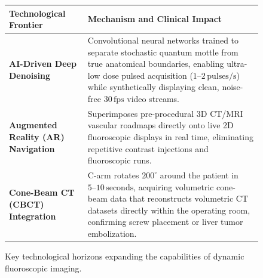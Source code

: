 \documentclass[11pt,a4paper]{article}
\begin{document}
\begin{figure}[htbp]
\centering
\setlength{\tabcolsep}{4pt}
\begin{tabular}{p{4.2cm}p{10.5cm}}
\toprule
\textbf{Technological Frontier} & \textbf{Mechanism and Clinical Impact} \\
\midrule
\textbf{AI-Driven Deep Denoising} & Convolutional neural networks trained to separate stochastic quantum mottle from true anatomical boundaries, enabling ultra-low dose pulsed acquisition ($1\text{--}2\,\text{pulses/s}$) while synthetically displaying clean, noise-free $30\,\text{fps}$ video streams. \\
\addlinespace
\textbf{Augmented Reality (AR) Navigation} & Superimposes pre-procedural 3D CT/MRI vascular roadmaps directly onto live 2D fluoroscopic displays in real time, eliminating repetitive contrast injections and fluoroscopic runs. \\
\addlinespace
\textbf{Cone-Beam CT (CBCT) Integration} & C-arm rotates $200^\circ$ around the patient in $5\text{--}10\,\text{seconds}$, acquiring volumetric cone-beam data that reconstructs volumetric CT datasets directly within the operating room, confirming screw placement or liver tumor embolization. \\
\bottomrule
\end{tabular}
\caption{Key technological horizons expanding the capabilities of dynamic fluoroscopic imaging.}
\label{tab:future_horizons}
\end{figure}
\end{document}
